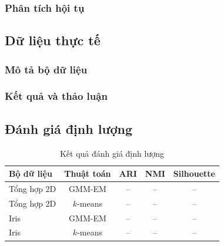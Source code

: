 \subsubsection{Phân tích hội tụ}


\subsection{Dữ liệu thực tế}

\subsubsection{Mô tả bộ dữ liệu}

\subsubsection{Kết quả và thảo luận}


\subsection{Đánh giá định lượng}

\begin{table}[H]
  \centering
  \caption{Kết quả đánh giá định lượng}
  \label{tab:quantitative}
  \begin{tabular}{lcccc}
    \toprule
    \textbf{Bộ dữ liệu} & \textbf{Thuật toán} & \textbf{ARI} & \textbf{NMI} & \textbf{Silhouette} \\
    \midrule
    Tổng hợp 2D & GMM-EM  & -- & -- & -- \\
    Tổng hợp 2D & $k$-means & -- & -- & -- \\
    \midrule
    Iris        & GMM-EM  & -- & -- & -- \\
    Iris        & $k$-means & -- & -- & -- \\
    \bottomrule
  \end{tabular}
\end{table}

